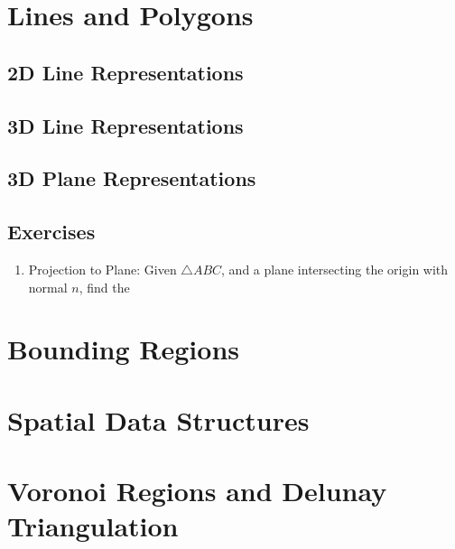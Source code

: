 \documentclass[12pt]{report}
\begin{document}
\chapter{Lines and Polygons}
	\section{2D Line Representations}
	\section{3D Line Representations}
	\section{3D Plane Representations}
	\section{Exercises}
		\begin{enumerate}
			\item Projection to Plane: Given $\triangle ABC$, and a plane intersecting the origin with normal $n$, find the 
		\end{enumerate}
\chapter{Bounding Regions}
\chapter{Spatial Data Structures}
\chapter{Voronoi Regions and Delunay Triangulation}
\end{document}
